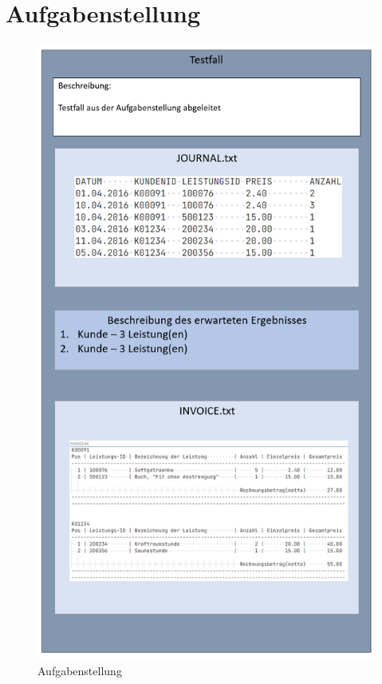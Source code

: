 \section{Aufgabenstellung}\label{subsec:aufgabenstellung}
\begin{figure}[!h]
    \centering
    \includegraphics[width=\textwidth,height=\textheight,keepaspectratio]{images/Testdokumentation/Aufgabestellung/aufgabenstellung.png}
    \caption{Aufgabenstellung}
\end{figure}

